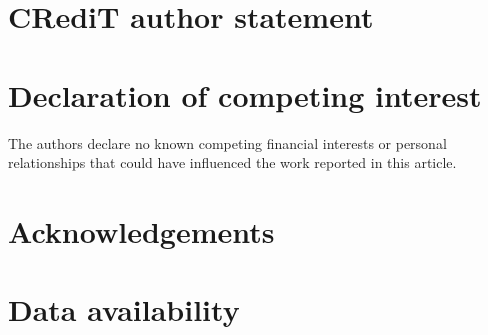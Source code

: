 \documentclass[review,3p,times]{elsarticle}
\begin{document}
\section*{CRediT author statement}


\section{Declaration of competing interest}
The authors declare no known competing financial interests or personal
relationships that could have influenced the work reported in this
article.

\section{Acknowledgements}


\section*{Data availability}




\end{document}
